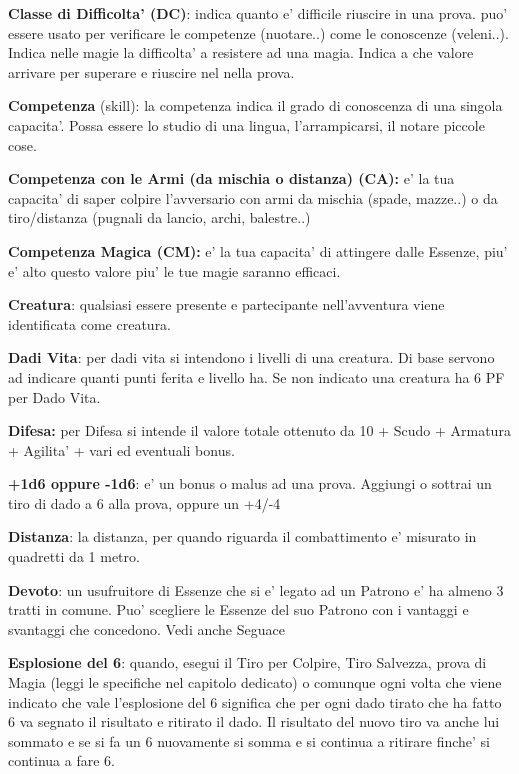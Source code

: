 \documentclass[a4paper,11pt,twoside,openany]{book}
\begin{document}
	\textbf{Classe di Difficolta' (DC)}: indica quanto e' difficile riuscire in una prova. puo' essere usato per verificare le competenze (nuotare..) come le conoscenze (veleni..). Indica nelle magie la difficolta' a resistere ad una magia. Indica a che valore arrivare per superare e riuscire nel nella prova.
	
	\textbf{Competenza} (skill): la competenza indica il grado di conoscenza di una singola capacita'. Possa essere lo studio di una lingua, l'arrampicarsi, il notare piccole cose.
	
	\textbf{Competenza con le Armi (da mischia o distanza) (CA):} e' la tua capacita' di saper colpire l'avversario con armi da mischia (spade, mazze..) o da tiro/distanza (pugnali da lancio, archi, balestre..) 
	
	\textbf{Competenza Magica (CM):} e' la tua capacita' di attingere dalle Essenze, piu' e' alto questo valore piu' le tue magie saranno efficaci.
	
	\textbf{Creatura}: qualsiasi essere presente e partecipante nell'avventura viene identificata come creatura.
	
	\textbf{Dadi Vita}: per dadi vita si intendono i livelli di una creatura. Di base servono ad indicare quanti punti ferita e livello ha. Se non indicato una creatura ha 6 PF per Dado Vita.
	
	\textbf{Difesa:} per Difesa si intende il valore totale ottenuto da 10 + Scudo + Armatura + Agilita' + vari ed eventuali bonus.
	
	\textbf{+1d6 oppure -1d6}: e' un bonus o malus ad una prova. Aggiungi o sottrai un tiro di dado a 6 alla prova, oppure un +4/-4
	
	\textbf{Distanza}: la distanza, per quando riguarda il combattimento e' misurato in quadretti da 1 metro.
	
	\textbf{Devoto}: un usufruitore di Essenze che si e’ legato ad un Patrono e’ ha almeno 3 tratti in comune.
	Puo’ scegliere le Essenze del suo Patrono con i vantaggi e svantaggi che concedono. Vedi anche Seguace
	
	\textbf{Esplosione del 6}: quando, esegui il Tiro per Colpire, Tiro Salvezza, prova di Magia (leggi le specifiche nel capitolo dedicato) o comunque ogni volta che viene indicato che vale l'esplosione del 6 significa che per ogni dado tirato che ha fatto 6 va segnato il risultato e ritirato il dado. Il risultato del nuovo tiro va anche lui sommato e se si fa un 6 nuovamente si somma e si continua a ritirare finche' si continua a fare 6.
	
\end{document}
